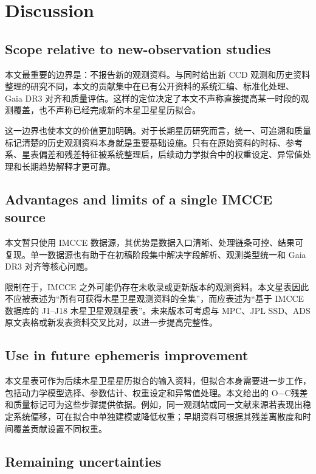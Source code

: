 \documentclass{aastex701}
\newcommand{\oc}{O$-$C}
\begin{document}
\section{Discussion} \label{sec:discussion}

\subsection{Scope relative to new-observation studies} \label{subsec:no_new_obs}

本文最重要的边界是：不报告新的观测资料。与同时给出新 CCD 观测和历史资料整理的研究不同，本文的贡献集中在已有公开资料的系统汇编、标准化处理、Gaia DR3 对齐和质量评估。这样的定位决定了本文不声称直接提高某一时段的观测覆盖，也不声称已经完成新的木星卫星星历拟合。

这一边界也使本文的价值更加明确。对于长期星历研究而言，统一、可追溯和质量标记清楚的历史观测资料本身就是重要基础设施。只有在原始资料的时标、参考系、星表偏差和残差特征被系统整理后，后续动力学拟合中的权重设定、异常值处理和长期趋势解释才更可靠。

\subsection{Advantages and limits of a single IMCCE source} \label{subsec:imcce_limit}

本文暂只使用 IMCCE 数据源，其优势是数据入口清晰、处理链条可控、结果可复现。单一数据源也有助于在初稿阶段集中解决字段解析、观测类型统一和 Gaia DR3 对齐等核心问题。

限制在于，IMCCE 之外可能仍存在未收录或更新版本的观测资料。本文星表因此不应被表述为“所有可获得木星卫星观测资料的全集”，而应表述为“基于 IMCCE 数据库的 J1--J18 木星卫星观测星表”。未来版本可考虑与 MPC、JPL SSD、ADS 原文表格或新发表资料交叉比对，以进一步提高完整性。

\subsection{Use in future ephemeris improvement} \label{subsec:future_ephem}

本文星表可作为后续木星卫星星历拟合的输入资料，但拟合本身需要进一步工作，包括动力学模型选择、参数估计、权重设定和异常值处理。本文给出的 \oc 残差和质量标记可为这些步骤提供依据。例如，同一观测站或同一文献来源若表现出稳定系统偏移，可在拟合中单独建模或降低权重；早期资料可根据其残差离散度和时间覆盖贡献设置不同权重。

\subsection{Remaining uncertainties} \label{subsec:remaining}
\end{document}
